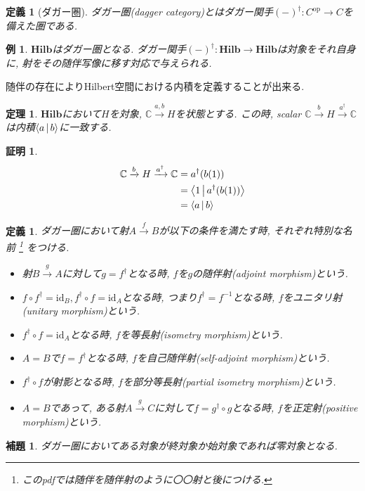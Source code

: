 \documentclass[a4paper,12pt]{ltjsarticle}
\theoremstyle{break}
\newtheorem{defn}[thm]{定義}
\newtheorem{lem}[thm]{補題}
\newtheorem{thrm}[thm]{定理}
\newtheorem{eg}[thm]{例}
\newtheorem*{prf}{証明}
\newcommand{\hilb}{\mathbf{Hilb}}
\newcommand{\mbc}{\mathbb{C}}
\newcommand{\Op}{\mathrm{op}}
\newcommand{\xr}[1]{\xrightarrow{#1}}
\newcommand{\id}{\mathrm{id}}
\newcommand{\ci}{\circ}
\newcommand{\da}{\dagger}
\numberwithin{equation}{section}
\begin{document}
\begin{defn}[ダガー圏]
  ダガー圏(dagger category)とはダガー関手$(-)^\da: C^{\Op} \to C$を備えた圏である. 
\end{defn} 

\begin{eg}
  $\hilb$はダガー圏となる. 
  ダガー関手$(-)^\da: \hilb \to \hilb$は対象をそれ自身に, 射をその随伴写像に移す対応で与えられる. 
\end{eg}

随伴の存在によりHilbert空間における内積を定義することが出来る. 

\begin{thrm}
  $\hilb$において$H$を対象, $\mbc \xr{a,b} H$を状態とする. この時, scalar $\mbc \xr{b} H \xr{a^\da} \mbc$は内積$\Braket{a|b}$に一致する. 
\end{thrm}

\begin{prf}
  \begin{align*}
    \mbc \xr{b} H \xr{a^\da} \mbc
    &= a^\da(b(1)) \\
    &= \Braket{1|a^\da(b(1))} \\
    &= \Braket{a|b}
  \end{align*}
\end{prf}

\begin{defn}
  ダガー圏において射$A \xr{f} B$が以下の条件を満たす時, それぞれ特別な名前
  \footnote{
    このpdfでは随伴を随伴射のように〇〇射と後につける.  
  }
  をつける.
  \begin{itemize}
    \item 射$B \xr{g} A$に対して$g=f^\da$となる時, $f$を$g$の随伴射(adjoint morphism)という. 
    \item $f \ci f^\da = \id_B, f^\da \ci f = \id_A$となる時, つまり$f^\da=f^{-1}$となる時, $f$をユニタリ射(unitary morphism)という. 
    \item $f^\da \ci f = \id_A$となる時, $f$を等長射(isometry morphism)という.
    \item $A=B$で$f=f^\da$となる時, $f$を自己随伴射(self-adjoint morphism)という. 
    \item $f^\da \circ f$が射影となる時, $f$を部分等長射(partial isometry morphism)という. 
    \item $A=B$であって, ある射$A \xr{g} C$に対して$f=g^\da \ci g$となる時, $f$を正定射(positive morphism)という. 
  \end{itemize}
\end{defn} 

\begin{lem}
  ダガー圏においてある対象が終対象か始対象であれば零対象となる. 
\end{lem}
\end{document}
